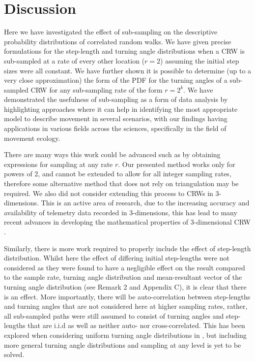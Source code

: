 \documentclass[english]{article}
\begin{document}
\section{Discussion}



Here we have investigated the effect of sub-sampling on the descriptive probability distributions of correlated random walks.  We have given precise formulations for the step-length and turning angle distributions when a CRW is sub-sampled at a rate of every other location ($r=2$) assuming the initial step sizes were all constant.  We have further shown it is possible to determine (up to a very close approximation) the form of the PDF for the turning angles of a sub-sampled CRW for any sub-sampling rate of the form $r=2^k$. We have demonstrated the usefulness of sub-sampling as a form of data analysis by highlighting approaches where it can help in identifying the most appropriate model to describe movement in several scenarios, with our findings having applications in various fields across the sciences, specifically in the field of movement ecology.



There are many ways this work could be advanced such as by obtaining expressions for sampling at any rate $r$.  Our presented method works only for powers of 2, and cannot be extended to allow for all integer sampling rates, therefore some alternative method that does not rely on triangulation may be required.  We also did not consider extending this process to CRWs in 3-dimensions.  This is an active area of research, due to the increasing accuracy and availability of telemetry data recorded in 3-dimensions, this has lead to many recent advances in developing the mathematical properties of 3-dimensional CRW \citep{ahmed2023random,sadjadi2015persistent}.  



Similarly, there is more work required to properly include the effect of step-length distribution.  Whilst here the effect of differing initial step-lengths were not considered as they were found to have a negligible effect on the result compared to the sample rate, turning angle distribution and mean-resultant vector of the turning angle distribution (see Remark 2 and Appendix C), it is clear that there is an effect.  More importantly, there will be auto-correlation between step-lengths and turning angles that are not considered here at higher sampling rates, rather, all sub-sampled paths were still assumed to consist of turning angles and step-lengths that are i.i.d as well as neither auto- nor cross-correlated.  This has been explored when considering uniform turning angle distributions in \citet{rosser2013effect}, but including more general turning angle distributions and sampling at any level is yet to be solved.
\end{document}
